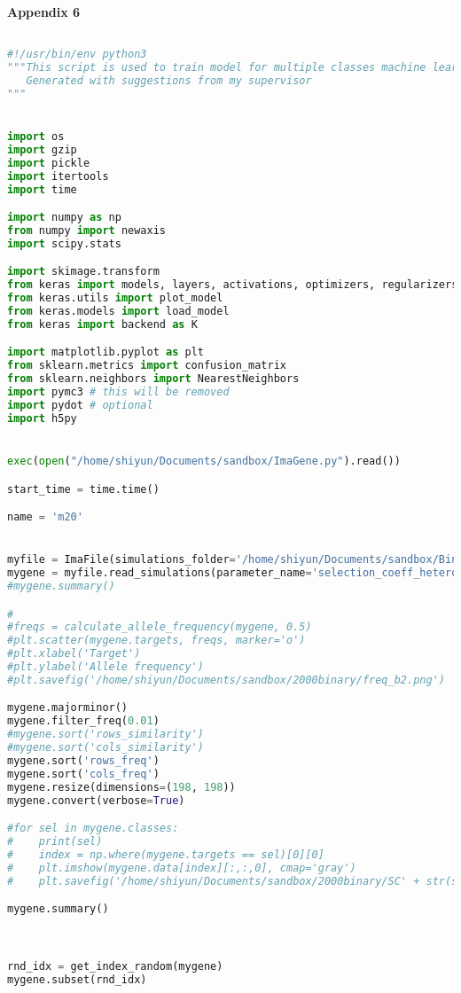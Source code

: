 \cleardoublepage\clearpage
\large \vspace{1cm}
{\bf Appendix 6} 
\small 

\begin{lstlisting}[language=Python,breaklines]

#!/usr/bin/env python3
"""This script is used to train model for multiple classes machine learning
   Generated with suggestions from my supervisor
"""


import os
import gzip
import pickle
import itertools
import time

import numpy as np
from numpy import newaxis 
import scipy.stats

import skimage.transform
from keras import models, layers, activations, optimizers, regularizers
from keras.utils import plot_model
from keras.models import load_model
from keras import backend as K

import matplotlib.pyplot as plt
from sklearn.metrics import confusion_matrix
from sklearn.neighbors import NearestNeighbors
import pymc3 # this will be removed
import pydot # optional
import h5py 


exec(open("/home/shiyun/Documents/sandbox/ImaGene.py").read())

start_time = time.time()

name = 'm20'


myfile = ImaFile(simulations_folder='/home/shiyun/Documents/sandbox/Binary3/Simulations1.Epoch3',nr_samples=198, model_name='3epoch-CEU') 
mygene = myfile.read_simulations(parameter_name='selection_coeff_hetero', max_nrepl=2000)
#mygene.summary()

#
#freqs = calculate_allele_frequency(mygene, 0.5)
#plt.scatter(mygene.targets, freqs, marker='o')
#plt.xlabel('Target')
#plt.ylabel('Allele frequency')
#plt.savefig('/home/shiyun/Documents/sandbox/2000binary/freq_b2.png')

mygene.majorminor()
mygene.filter_freq(0.01)
#mygene.sort('rows_similarity')
#mygene.sort('cols_similarity')
mygene.sort('rows_freq')
mygene.sort('cols_freq')
mygene.resize(dimensions=(198, 198))
mygene.convert(verbose=True)

#for sel in mygene.classes:
#    print(sel)
#    index = np.where(mygene.targets == sel)[0][0]
#    plt.imshow(mygene.data[index][:,:,0], cmap='gray')
#    plt.savefig('/home/shiyun/Documents/sandbox/2000binary/SC' + str(sel) + '.png')

mygene.summary()



rnd_idx = get_index_random(mygene)
mygene.subset(rnd_idx)


\end{lstlisting}
